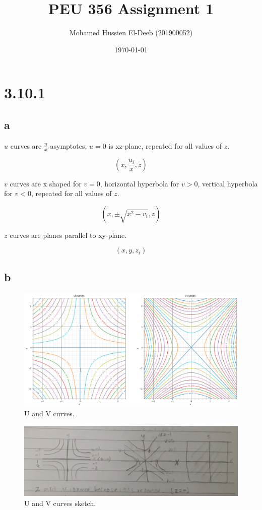 \documentclass[12pt]{article}
\title{PEU 356 Assignment 1}
\author{Mohamed Hussien El-Deeb (201900052)}
\date{\today}
\begin{document}
\maketitle
\tableofcontents

\section{3.10.1}

\subsection{a}

\(u\) curves are \(\frac{n}{x}\) asymptotes, \(u=0\) is xz-plane, repeated for all values of \(z\).

\[
    (x, \frac{u_i}{x}, z)
\]

\(v\) curves are x shaped for \(v=0\), horizontal hyperbola for \(v>0\), vertical hyperbola for \(v<0\), repeated for all values of \(z\).

\[
    (x, \pm\sqrt{x^2 - v_i}, z)
\]

\(z\) curves are planes parallel to xy-plane.


\[
    (x, y, z_i)
\]

\subsection{b}

\begin{figure}[H]
    \includegraphics[width=\linewidth]{Q1B.png}
    \caption{U and V curves.}
    \label{fig:Q1B}
\end{figure}

\begin{figure}[H]
    \includegraphics[width=\linewidth]{Q1B.jpg}
    \caption{U and V curves sketch.}
    \label{fig:Q1B2}
\end{figure}
\end{document}
